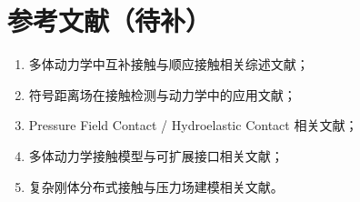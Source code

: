 \section*{参考文献（待补）}
\begin{enumerate}
    \item 多体动力学中互补接触与顺应接触相关综述文献；
    \item 符号距离场在接触检测与动力学中的应用文献；
    \item Pressure Field Contact / Hydroelastic Contact 相关文献；
    \item 多体动力学接触模型与可扩展接口相关文献；
    \item 复杂刚体分布式接触与压力场建模相关文献。
\end{enumerate}
